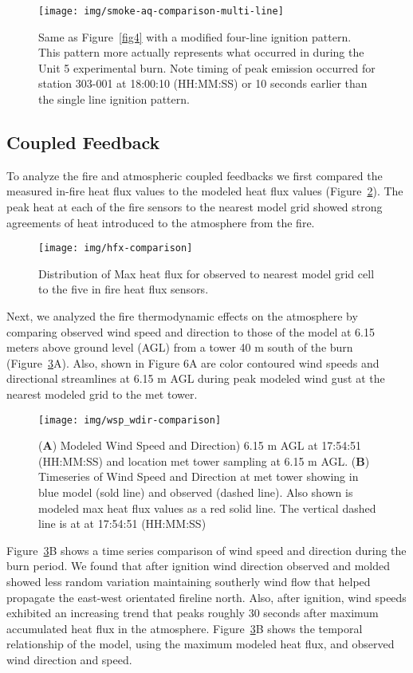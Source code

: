 \documentclass[preprints,article,accept,moreauthors,pdftex]{Definitions/mdpi}
\begin{document}
\begin{figure}[H]
\centering
 \texttt{[image: img/smoke-aq-comparison-multi-line]}
 \caption{Same as Figure~\ref{fig4} with a modified four-line ignition pattern. This pattern more actually represents what occurred in during the Unit 5 experimental burn. Note timing of peak emission occurred for station 303-001 at 18:00:10 (HH:MM:SS) or 10 seconds earlier than the single line ignition pattern.\label{fig5}}
 \end{figure}


\subsection{Coupled Feedback}

To analyze the fire and atmospheric coupled feedbacks we first compared the measured in-fire heat flux values to the modeled heat flux values (Figure~\ref{fig6}). The peak heat at each of the fire sensors to the nearest model grid showed strong agreements of heat introduced to the atmosphere from the fire.

\begin{figure}[H]
\centering
 \texttt{[image: img/hfx-comparison]}
 \caption{Distribution of Max heat flux for observed to nearest model grid cell to the five in fire heat flux sensors.\label{fig6}}
 \end{figure}

Next, we analyzed the fire thermodynamic effects on the atmosphere by comparing observed wind speed and direction to those of the model at 6.15 meters above ground level (AGL) from a tower 40 m south of the burn (Figure~\ref{fig7}A). Also, shown in Figure 6A are color contoured wind speeds and directional streamlines at 6.15 m AGL during peak modeled wind gust at the nearest modeled grid to the met tower.

\begin{figure}[H]
\centering
 \texttt{[image: img/wsp\_wdir-comparison]}
 \caption{(\textbf{A}) Modeled Wind Speed and Direction) 6.15 m AGL at 17:54:51 (HH:MM:SS) and location met tower sampling at 6.15 m AGL. (\textbf{B}) Timeseries of Wind Speed and Direction at met tower showing in blue model (sold line) and observed (dashed line). Also shown is modeled max heat flux values as a red solid line. The vertical dashed line is at at 17:54:51 (HH:MM:SS)\label{fig7}}
 \end{figure}

Figure~\ref{fig7}B shows a time series comparison of wind speed and direction during the burn period. We found that after ignition wind direction observed and molded showed less random variation maintaining southerly wind flow that helped propagate the east-west orientated fireline north. Also, after ignition, wind speeds exhibited an increasing trend that peaks roughly 30 seconds after maximum accumulated heat flux in the atmosphere. Figure~\ref{fig7}B shows the temporal relationship of the model, using the maximum modeled heat flux, and observed wind direction and speed.
\end{document}
